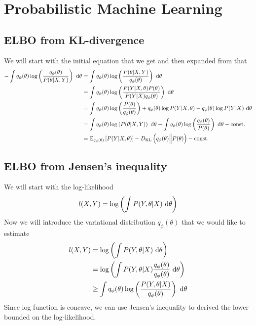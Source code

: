 \section {Probabilistic Machine Learning}
\subsection{ELBO from KL-divergence}
\label{appendix-1:elbo-kl}
We will start with the initial equation that we get and then expanded from that 
\begin{equation*}
    \begin{aligned}
        -\int q_{\phi} (\theta) \log\left( \frac{q_{\phi} (\theta)}{P(\theta | X, Y)} \right) \ \mathrm{d} \theta &= \int q_{\phi} (\theta) \log\left( \frac{P(\theta | X, Y)}{q_{\phi} (\theta)} \right) \ \mathrm{d} \theta \\ 
        &= \int q_{\phi} (\theta) \log\left( \frac{P(Y | X, \theta) P(\theta)}{P(Y|X)q_{\phi} (\theta)} \right) \ \mathrm{d} \theta \\
        &= \int q_{\phi} (\theta) \log \left( \frac{P(\theta)}{q_{\phi} (\theta)} \right) + q_{\phi} (\theta) \log P(Y | X, \theta) - q_{\phi} (\theta) \log P(Y| X) \ \mathrm{d} \theta \\
        &= \int q_{\phi} (\theta) \log\left( P(\theta | X, Y) \right) \ \mathrm{d} \theta - \int q_{\phi} (\theta) \log\left( \frac{q_{\phi} (\theta)}{P(\theta)} \right) \ \mathrm{d} \theta  - \text{const.} \\
        &= \mathbb{E}_{q_{\phi} (\theta)} \left[ P(Y | X, \theta) \right] - D_{\mathrm{KL}} \left(q_{\phi} (\theta) \Big\| P(\theta) \right) - \text{const.} \\
    \end{aligned}
\end{equation*}


\subsection{ELBO from Jensen's inequality}
\label{appendix-1:elbo-jensen}
We will start with the log-likelihood 
\begin{equation}
    l(X, Y) = \log \left( \int P(Y,  \theta | X) \ \mathrm{d} \theta \right)
\end{equation}
Now we will introduce the variational distribution $q_{\phi}(\theta)$ that we would like to estimate
\begin{equation*}
    \begin{aligned}
        l(X, Y) &= \log \left( \int P(Y,  \theta | X) \ \mathrm{d} \theta \right) \\
        &= \log \left( \int P(Y,  \theta | X) \frac{q_{\phi}(\theta)}{q_{\phi}(\theta)} \ \mathrm{d} \theta \right) \\
        &\ge \int  q_{\phi}(\theta) \log\left(\frac{P(Y,  \theta | X)}{q_{\phi}(\theta)}\right) \ \mathrm{d} \theta
    \end{aligned}
\end{equation*}
Since log function is concave, we can use Jensen's inequality to derived the lower bounded on the log-likelihood.



